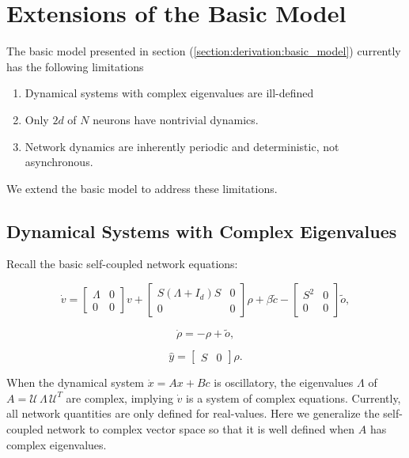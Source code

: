 \section{Extensions of the Basic Model}


The basic model presented in section (\ref{section:derivation:basic_model}) currently has the following limitations
\begin{enumerate}
\item Dynamical systems with complex eigenvalues are ill-defined
\item Only $2d$ of $N$ neurons have nontrivial dynamics. 
\item Network dynamics are inherently periodic and deterministic, not asynchronous. 
\end{enumerate}

We extend the basic model to address these limitations. 

\subsection{Dynamical Systems with Complex Eigenvalues}
Recall the basic self-coupled network equations:

$$
\dot{v}
= 
\begin{bmatrix}
\Lambda & 0
\\
0 & 0
\end{bmatrix}
v +
\begin{bmatrix}
S \left(\Lambda + I_d \right) S & 0
\\
0 & 0
\end{bmatrix}
  \rho 
+ \beta \tilde{c}  
  - 
 \begin{bmatrix}
S^2 & 0
\\
0 & 0
\end{bmatrix}
    \tilde{o},
$$

$$
\dot{\rho} = -\rho + \tilde{o},
$$

$$
\hat{y} = \begin{bmatrix}
S & 0
\end{bmatrix}
\rho.
$$


When the dynamical system $\dot{x} = Ax + Bc$ is oscillatory, the eigenvalues $\Lambda$ of $A=\mathcal{U} \, \Lambda \, \mathcal{U}^T$ are complex, implying $\dot{v}$ is a system of complex equations. Currently, all network quantities are only defined for real-values. Here we generalize the self-coupled network to complex vector space so that it is well defined when $A$ has complex eigenvalues.



